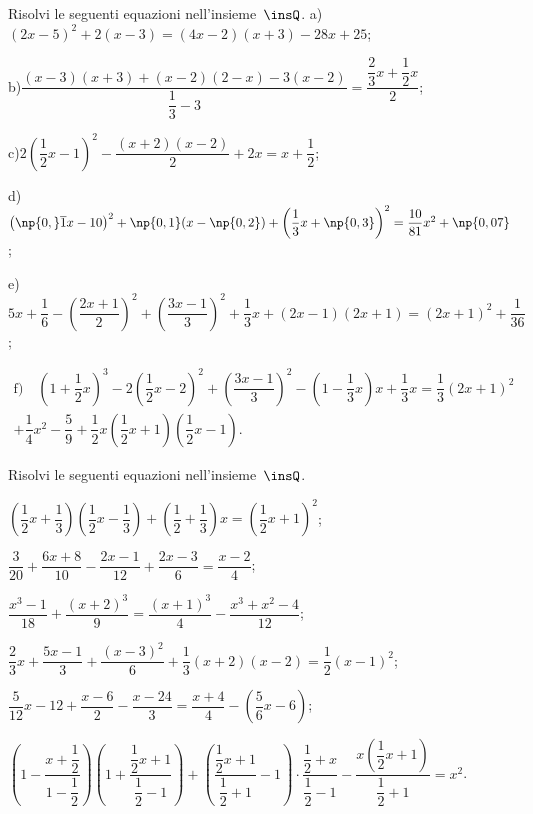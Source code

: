 \begin{esercizio}[\Ast]
\label{ese:15.39}
Risolvi le seguenti equazioni nell'insieme~$\insQ$.
 a)\quad $(2x-5)^2 +2(x-3)=(4x-2)(x+3)-28x+25$;
 
 b)\quad $\dfrac{(x-3)(x+3)+(x-2)(2-x)-3(x-2)}{\dfrac{1}{3}-3}=\dfrac{\dfrac{2}{3}x+\dfrac{1}{2}x}{2}$;
 
 c)\quad $2\left(\dfrac{1}{2}x-1\right)^{2}-\dfrac{(x+2)(x-2)}{2}+2x=x+\dfrac{1}{2}$;
 
 d)\quad  $\left(\np{0,}\overline{{1}}x-10\right)^{2}+\np{0,1}(x-\np{0,2})+\left(\dfrac{1}{3}x+\np{0,3}\right)^{2}=\dfrac{10}{81}x^{2}+\np{0,07}$;
 
 e)\quad  $5x+\dfrac{1}{6}-\left(\dfrac{2x+1}{2}\right)^{2}+\left(\dfrac{3x-1}{3}\right)^{2}+\dfrac{1}{3}x+(2x-1)(2x+1)=(2x+1)^{2}+\dfrac{1}{36}$;
 
 \begin{multline*}\text{f)}\quad \left(1+\dfrac{1}{2}x\right)^{3}-2\left(\dfrac{1}{2}x-2\right)^{2}+\left(\dfrac{3x-1}{3}\right)^{2}-\left(1-\dfrac{1}{3}x\right)x+\dfrac{1}{3}x={\dfrac{1}{3}}(2x+1)^{2} \\
     +\dfrac{1}{4}x^{2}-\dfrac{5}{9}+\dfrac{1}{2}x\left(\dfrac{1}{2}x+1\right)\left(\dfrac{1}{2}x-1\right).\end{multline*}
\end{esercizio}
\pagebreak
\begin{esercizio}[\Ast]
\label{ese:15.40}
Risolvi le seguenti equazioni nell'insieme~$\insQ$.
\begin{enumeratea}
 \item $\left(\dfrac{1}{2}x+\dfrac{1}{3}\right)\left(\dfrac{1}{2}x-\dfrac{1}{3}\right)+\left(\dfrac{1}{2}+\dfrac{1}{3}\right)x=\left(\dfrac{1}{2}x+1\right)^{2}$;
 \item $\dfrac{3}{20}+\dfrac{6x+8}{10}-\dfrac{2x-1}{12}+\dfrac{2x-3}{6}=\dfrac{x-2}{4}$;
 \item $\dfrac{x^{3}-1}{18}+\dfrac{(x+2)^{3}}{9}=\dfrac{(x+1)^{3}}{4}-\dfrac{x^{3}+x^{2}-4}{12}$;
 \item $\dfrac{2}{3}x+\dfrac{5x-1}{3}+\dfrac{(x-3)^{2}}{6}+\dfrac{1}{3}(x+2)(x-2)=\dfrac{1}{2}(x-1)^{2}$;
 \item $\dfrac{5}{12}x-12+\dfrac{x-6}{2}-\dfrac{x-24}{3}=\dfrac{x+4}{4}-\left(\dfrac{5}{6}x-6\right)$;
 \item $\left(1-\dfrac{x+\dfrac{1}{2}}{1-\dfrac{1}{2}}\right)\left(1+\dfrac{\dfrac{1}{2}x+1}{\dfrac{1}{2}-1}\right)+\left(\dfrac{\dfrac{1}{2}x+1}{\dfrac{1}{2}+1}-1\right)\cdot {\dfrac{\dfrac{1}{2}+x}{\dfrac{1}{2}-1}}-\dfrac{x\left(\dfrac{1}{2}x+1\right)}{\dfrac{1}{2}+1}=x^{2}$.
\end{enumeratea}
\end{esercizio}

